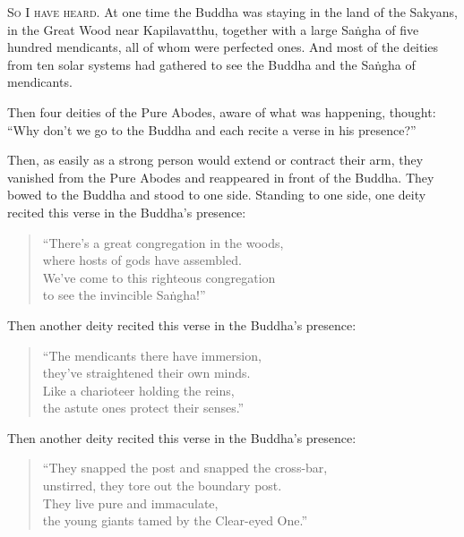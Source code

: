 \documentclass[12pt,openany]{book}%
\newcommand*{\scevam}[1]{\textsc{#1}}
\begin{document}
\scevam{So I have heard. }At one time the Buddha was staying in the land of the Sakyans, in the Great Wood near Kapilavatthu, together with a large \textsanskrit{Saṅgha} of five hundred mendicants, all of whom were perfected ones. And most of the deities from ten solar systems had gathered to see the Buddha and the \textsanskrit{Saṅgha} of mendicants. 

Then four deities of the Pure Abodes, aware of what was happening, thought: “Why don’t we go to the Buddha and each recite a verse in his presence?” 

Then, as easily as a strong person would extend or contract their arm, they vanished from the Pure Abodes and reappeared in front of the Buddha. They bowed to the Buddha and stood to one side. Standing to one side, one deity recited this verse in the Buddha’s presence: 

\begin{verse}%
“There’s a great congregation in the woods, \\
where hosts of gods have assembled. \\
We’ve come to this righteous congregation \\
to see the invincible \textsanskrit{Saṅgha}!” 

%
\end{verse}

Then another deity recited this verse in the Buddha’s presence: 

\begin{verse}%
“The mendicants there have immersion, \\
they’ve straightened their own minds. \\
Like a charioteer holding the reins, \\
the astute ones protect their senses.” 

%
\end{verse}

Then another deity recited this verse in the Buddha’s presence: 

\begin{verse}%
“They snapped the post and snapped the cross-bar, \\
unstirred, they tore out the boundary post. \\
They live pure and immaculate, \\
the young giants tamed by the Clear-eyed One.” 

%
\end{verse}
\end{document}
